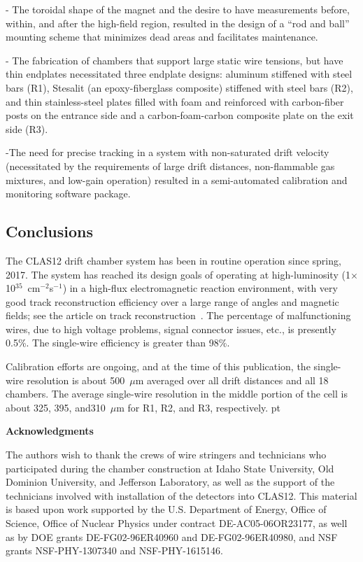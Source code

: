 \noindent
- The toroidal shape of the magnet and the desire to have measurements before, within, 
and after the high-field region, resulted in the design of a ``rod and ball'' mounting scheme
that minimizes dead areas and facilitates maintenance.

\noindent
- The fabrication of chambers that support large static wire tensions, but have thin 
endplates necessitated three endplate designs: aluminum stiffened with steel bars (R1),
Stesalit (an epoxy-fiberglass composite) stiffened with steel bars (R2), and thin stainless-steel 
plates filled with foam and reinforced
with carbon-fiber posts on the entrance side and a carbon-foam-carbon composite plate on the exit side (R3). 

\noindent
-The need for precise tracking in a system with non-saturated drift velocity 
(necessitated by the requirements of large drift distances, non-flammable gas mixtures, 
and low-gain operation) resulted in a semi-automated calibration and monitoring software 
package.

\subsection{Conclusions}

The CLAS12 drift chamber system has been in routine operation since spring, 2017. 
The system has reached its design goals of operating at high-luminosity
(1$\times$10$^{35}$~cm$^{-2}$s$^{-1}$) in a high-flux electromagnetic reaction
environment, with very good track reconstruction efficiency over a large range of angles and 
magnetic fields; see the article on track reconstruction~\cite{recon-nim}.  
The percentage of malfunctioning wires, due to high voltage problems, signal
connector issues, etc., is presently 0.5\%.
The single-wire efficiency is greater than 98\%.

Calibration efforts are ongoing, and at the time of this publication, the
single-wire resolution is about 500~$\mu$m averaged over all drift distances and
all 18 chambers.  The average single-wire resolution in the middle 
portion of the cell is about 325, 395, and310~$\mu$m for R1, R2, and R3, respectively.
 pt

{\large{\bf Acknowledgments}}

\vskip 10pt

The authors wish to thank the crews of wire stringers and technicians who 
participated during the chamber construction at Idaho State University,
Old Dominion University, and Jefferson Laboratory, as well as the support of 
the technicians involved with installation of the detectors into CLAS12. 
This material is based upon work supported by the U.S. Department of Energy,
Office of Science, Office of Nuclear Physics under contract DE-AC05-06OR23177,
as well as by DOE grants DE-FG02-96ER40960 and DE-FG02-96ER40980, and NSF grants
NSF-PHY-1307340 and NSF-PHY-1615146.





